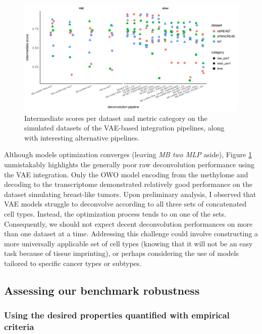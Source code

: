 \documentclass{article}
\begin{document}
\begin{figure}[htp]
    \centering
    \includegraphics[width=\textwidth,keepaspectratio]{fig/unsup_simu_vaetop.png}
    \caption{Intermediate scores per dataset and metric category on the simulated datasets of the VAE-based integration pipelines, along with interesting alternative pipelines.}
    \label{fig:unsup_simu_vaetop}
\end{figure}

Although models optimization converges (leaving \textit{MB two MLP} aside), Figure \ref{fig:unsup_simu_vaetop} unmistakably highlights the generally poor raw deconvolution performance using the VAE integration.
Only the OWO model encoding from the methylome and decoding to the transcriptome demonstrated relatively good performance on the dataset simulating breast-like tumors.
Upon preliminary analysis, I observed that VAE models struggle to deconvolve according to all three sets of concatenated cell types.
Instead, the optimization process tends to  on one of the sets.
Consequently, we should not expect decent deconvolution performances on more than one dataset at a time.
Addressing this challenge could involve constructing a more universally applicable set of cell types (knowing that it will not be an easy task because of tissue imprinting), or perhaps considering the use of models tailored to specific cancer types or subtypes.

\subsection{Assessing our benchmark robustness}\label{subsec:assessing-our-benchmark-robustness}

\subsubsection{Using the desired properties quantified with empirical criteria}
\end{document}
